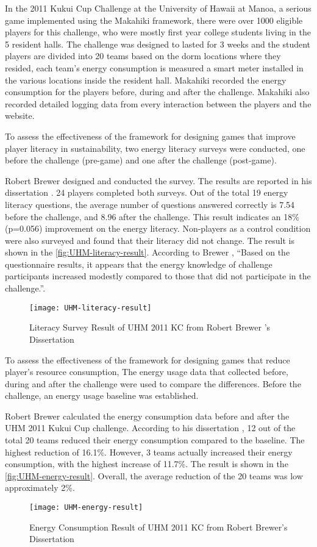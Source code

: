In the 2011 Kukui Cup Challenge at the University of Hawaii at Manoa, a serious game implemented using the Makahiki framework, there were over 1000 eligible players for this challenge, who were mostly first
year college students living in the 5 resident halls. The challenge was designed to lasted for 3 weeks and the student players are divided into 20 teams based on the dorm locations where they resided, each team's energy consumption is measured a smart meter installed in the various locations inside the resident hall. Makahiki recorded the energy consumption for the players before, during and after the challenge. Makahiki also recorded detailed logging data from every interaction between the players and the website. 

To assess the effectiveness of the framework for designing games that improve player literacy in sustainability, 
 two energy literacy surveys were conducted, one before the challenge (pre-game) and one after
the challenge (post-game). 

Robert Brewer designed and conducted the survey. The results are reported in his dissertation \cite{csdl2-10-08}. 24 players completed both surveys. Out of the total 19 energy literacy questions, the average number of questions answered correctly is 7.54 before the
challenge, and 8.96 after the challenge. This result indicates an 18\% (p=0.056) improvement on the
energy literacy.  Non-players as a control condition were also surveyed and found that their literacy did not change. The result is shown in the \autoref{fig:UHM-literacy-result}. According to Brewer \cite{csdl2-10-08}, ``Based on the questionnaire results, it appears that the energy knowledge of challenge participants increased modestly compared to those that did not participate in the challenge.''.
\begin{figure}[ht!]
  \center
  \texttt{[image: UHM-literacy-result]}
  \caption{Literacy Survey Result of UHM 2011 KC from Robert Brewer 's Dissertation \cite{csdl2-10-08}}
  \label{fig:UHM-literacy-result}
\end{figure}

To assess the effectiveness of the framework for designing games that reduce player's resource consumption, The energy usage data that collected before, during and after the
challenge were used to compare the differences.  Before the challenge, an energy usage baseline was established. 

Robert Brewer calculated the energy consumption data before and after the UHM 2011 Kukui Cup challenge. According to his dissertation \cite{csdl2-10-08}, 12 out of the total 20 teams reduced their energy
consumption compared to the baseline. The highest reduction of 16.1\%. However, 3 teams actually increased
their energy consumption, with the highest increase of 11.7\%. The result is shown in the \autoref{fig:UHM-energy-result}. Overall, the average reduction of the 20 teams was low \- approximately 2\%.  
\begin{figure}[ht!]
  \center
  \texttt{[image: UHM-energy-result]}
  \caption{Energy Consumption Result of UHM 2011 KC from Robert Brewer's Dissertation \cite{csdl2-10-08}}
  \label{fig:UHM-energy-result}
\end{figure}

